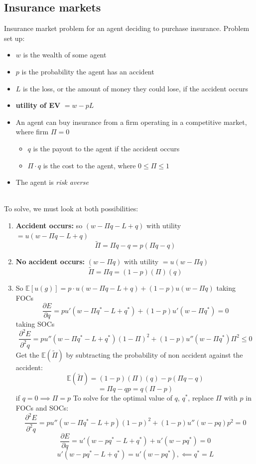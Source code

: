 \documentclass{article}
\begin{document}
\subsection{Insurance markets}
Insurance market problem for an agent deciding to purchase insurance. Problem set up: 
\begin{itemize}
    \item $w$ is the wealth of some agent
    \item $p$ is the probability the agent has an accident
    \item $L$ is the loss, or the amount of money they could lose, if the accident occurs
    \item \textbf{utility of EV} $=w-pL$
    \item An agent can buy insurance from a firm operating in a competitive market, where firm $ \Pi = 0$
    \begin{itemize}
        \item $q$ is the payout to the agent if the accident occurs
        \item $\Pi \cdot q $ is the cost to the agent, where $0 \leq \Pi \leq 1$ 
    \end{itemize}
    \item The agent is \textit{risk averse}
\end{itemize}
\\
\noindent To solve, we must look at both possibilities: 
\begin{enumerate}
    \item \textbf{Accident occurs:} so $(w- \Pi q - L + q )$ with utility $= u(w- \Pi q - L + q )$
    \[
    \tilde{\Pi} = \Pi q - q = p(\Pi q - q)
    \]
    \item \textbf{No accident occurs:} $(w-\Pi q)$ with utility $= u(w- \Pi q )$
     \[
    \tilde{\Pi} = \Pi q = (1-p)(\Pi)(q) 
    \]
    \item So $\mathbb{E}[u(g)] = p\cdot u(w - \Pi q - L +q) + (1-p)u(w-\Pi q)$
    taking FOCs \[
    \frac{\partial E}{\partial q} =pu'(w - \Pi q^* - L +q^*) +(1-p)u'(w-\Pi q^*) = 0 
    \]
    taking SOCs \[
    \frac{\partial^2 E}{\partial^2 q} =pu''(w - \Pi q^* - L +q^*)(1-\Pi)^2 +(1-p)u''(w-\Pi q^*)\Pi ^2 \leq 0 
    \]
    Get the $\mathbb{E}(\tilde{\Pi})$ by subtracting the probability of non accident against the accident: \[
    \mathbb{E}(\tilde{\Pi}) = (1-p)(\Pi)(q)  - p(\Pi q - q)
    \]
    \[
    = \Pi q - qp = q(\Pi - p) 
    \]
    if $q = 0 \implies \Pi = p$
    To solve for the optimal value of $q$, $q^*$, replace $\Pi$ with $p$ in FOCs and SOCs:
    \[
    \frac{\partial^2 E}{\partial^2 q} = pu''(w - \Pi q^* - L +p)(1-p)^2 +(1-p)u''(w- pq)p ^2 = 0 
    \]
    \[
    \frac{\partial E}{\partial q} = u'(w - pq^* - L +q^*) + u'(w- pq^*) = 0 
    \]
    \[
    u'(w - pq^*-L +q^*) = u'(w- pq^*), \impliedby q^* = L
    \]
\end{enumerate}
\end{document}
